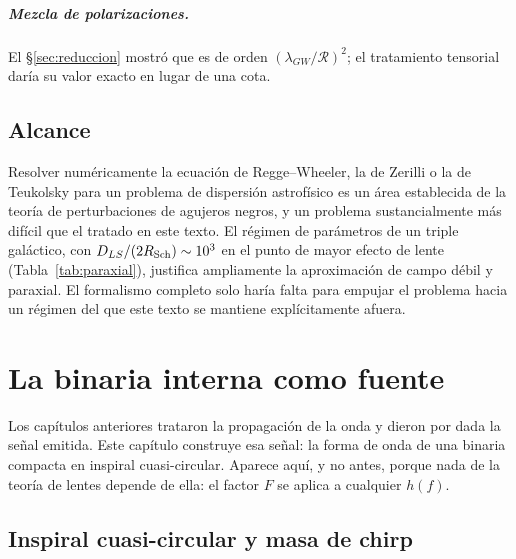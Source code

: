 \documentclass[11pt,a4paper,openany]{book}
\begin{document}
\paragraph{Mezcla de polarizaciones.} El \S\ref{sec:reduccion} mostr\'o que es
de orden $(\lambda_{GW}/\mathcal{R})^{2}$; el tratamiento tensorial dar\'ia su
valor exacto en lugar de una cota.

\section{Alcance}
\label{sec:alcance}

Resolver num\'ericamente la ecuaci\'on de Regge--Wheeler, la de Zerilli o la
de Teukolsky para un problema de dispersi\'on astrof\'isico es un \'area
establecida de la teor\'ia de perturbaciones de agujeros negros, y un problema
sustancialmente m\'as dif\'icil que el tratado en este texto. El r\'egimen de
par\'ametros de un triple gal\'actico, con
$D_{LS}/(2R_{\rm Sch})\sim10^{3}$ en el punto de mayor efecto de lente
(Tabla~\ref{tab:paraxial}), justifica ampliamente la aproximaci\'on de campo
d\'ebil y paraxial. El formalismo completo solo har\'ia falta para empujar el
problema hacia un r\'egimen del que este texto se mantiene expl\'icitamente
afuera.

\chapter{La binaria interna como fuente}
\label{ch:waveform}

Los cap\'itulos anteriores trataron la propagaci\'on de la onda y dieron por
dada la se\~nal emitida. Este cap\'itulo construye esa se\~nal: la forma de
onda de una binaria compacta en inspiral cuasi-circular. Aparece aqu\'i, y no
antes, porque nada de la teor\'ia de lentes depende de ella: el factor $F$ se
aplica a cualquier $h(f)$.

\section{Inspiral cuasi-circular y masa de chirp}
\label{sec:chirp}
\end{document}
